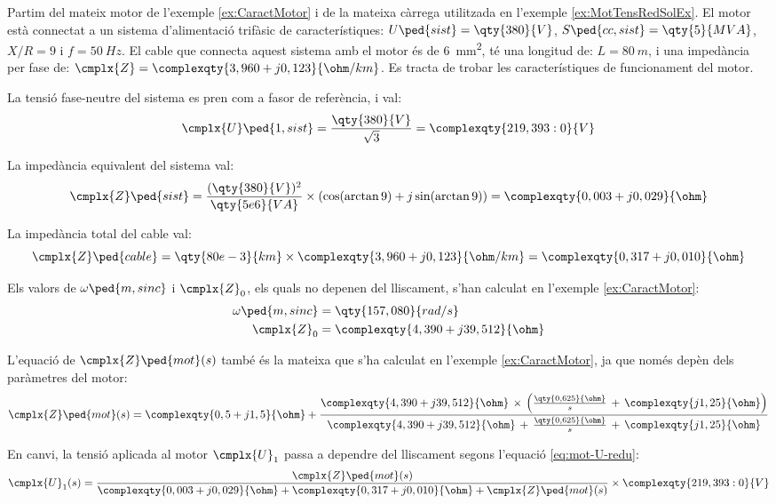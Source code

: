 \begin{exemple}\label{ex:MotTensRedIarr}
	\addcontentsxms{\MotTensRedIarr}
	Partim del mateix motor de l'exemple \vref{ex:CaractMotor} i de la mateixa càrrega utilitzada en l'exemple \vref{ex:MotTensRedSolEx}. El motor està connectat a un sistema d'alimentació trifàsic de característiques: $U\ped{sist}=\qty{380}{V}$, $S\ped{cc,sist}=\qty{5}{MVA}$, $X/R=9$ i $f=\qty{50}{Hz}$. El cable que connecta aquest sistema amb el motor és de \qty{6}{mm^2}, té una longitud de:  $L=\qty{80}{m}$, i una impedància per fase de: $\cmplx{Z} = \complexqty{3,960+j0,123}{\ohm/km}$. Es tracta de trobar les característiques de funcionament del motor.
	
	La tensió fase-neutre del sistema es pren com a fasor de referència, i val:
	\[
		\cmplx{U}\ped{1,sist} = \frac{\qty{380}{V}}{\sqrt{3}} = \complexqty{219,393:0}{V}
	\]
	
	La impedància equivalent del sistema val:
	\[
		\cmplx{Z}\ped{sist} = \frac{(\qty{380}{V})^2}{\qty{5e6}{VA}} \times (\cos(\arctan 9) + j \sin(\arctan 9)) = \complexqty{0,003+j0,029}{\ohm}	
	\]
	
	La impedància total del cable val:
	\[
		\cmplx{Z}\ped{cable} = \qty{80e-3}{km} \times \complexqty{3,960+j0,123}{\ohm/km} = \complexqty{0,317+j0,010}{\ohm}
	\]
	
	Els valors de $\omega\ped{m,sinc}$ i $\cmplx{Z}_0$, els quals no depenen del lliscament, s'han calculat en  l'exemple \ref{ex:CaractMotor}:
	\begin{align*}
		\omega\ped{m,sinc} &=  \qty{157,080}{rad/s} \\
		\cmplx{Z}_0 &=  \complexqty{4,390+j39,512}{\ohm} 
	\end{align*}
		
	L'equació de $\cmplx{Z}\ped{mot}(s)$ també és la mateixa que s'ha calculat en l'exemple  \ref{ex:CaractMotor}, ja que només depèn dels paràmetres del motor:
	\[
		\cmplx{Z}\ped{mot}(s) = \complexqty{0,5+j1,5}{\ohm} + \frac{\complexqty{4,390+j39,512}{\ohm}\,\times\,
		\left(\tfrac{\qty{0,625}{\ohm}}{s}\, + \, \complexqty{j1,25}{\ohm}\right)}{\complexqty{4,390+j39,512}{\ohm}\,+\,
		\tfrac{\qty{0,625}{\ohm}}{s}\, + \,\complexqty{j1,25}{\ohm}}  
	\] 
	
	En canvi, la tensió aplicada al motor $\cmplx{U}_1$ passa a dependre del lliscament segons l'equació \eqref{eq:mot-U-redu}:
	\[
		\cmplx{U}_1(s) = \frac{\cmplx{Z}\ped{mot}(s)}{\complexqty{0,003+j0,029}{\ohm} + \complexqty{0,317+j0,010}{\ohm}  +  \cmplx{Z}\ped{mot}(s)} \times \complexqty{219,393:0}{V}
	\]
	

\end{exemple}
